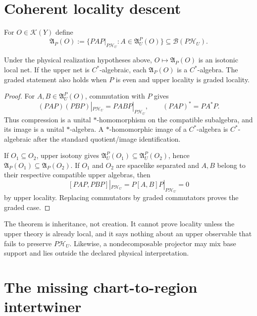 \documentclass[11pt]{article}
\begin{document}
\section{Coherent locality descent}

For $O\in\mathcal K(Y)$ define
\begin{equation}
 \mathfrak A_P(O)
 :=\{PAP|_{P\mathcal H_U}:A\in\mathfrak A_U^P(O)\}
 \subseteq\mathcal B(P\mathcal H_U).
 \label{eq:compressed-net}
\end{equation}

\begin{theorem}\label{thm:descent}
Under the physical realization hypotheses above, $O\mapsto\mathfrak A_P(O)$
is an isotonic local net.  If the upper net is $C^*$-algebraic, each
$\mathfrak A_P(O)$ is a $C^*$-algebra.  The graded statement also holds when
$P$ is even and upper locality is graded locality.
\end{theorem}

\begin{proof}
For $A,B\in\mathfrak A_U^P(O)$, commutation with $P$ gives
\[
 (PAP)(PBP)|_{P\mathcal H_U}=PABP|_{P\mathcal H_U},
 \qquad
 (PAP)^*=PA^*P.
\]
Thus compression is a unital $*$-homomorphism on the compatible subalgebra,
and its image is a unital $*$-algebra.  A $*$-homomorphic image of a
$C^*$-algebra is $C^*$-algebraic after the standard quotient/image
identification.

If $O_1\subseteq O_2$, upper isotony gives
$\mathfrak A_U^P(O_1)\subseteq\mathfrak A_U^P(O_2)$, hence
$\mathfrak A_P(O_1)\subseteq\mathfrak A_P(O_2)$.  If $O_1$ and $O_2$ are
spacelike separated and $A,B$ belong to their respective compatible upper
algebras, then
\[
 [PAP,PBP]|_{P\mathcal H_U}
 =P[A,B]P|_{P\mathcal H_U}=0
\]
by upper locality.  Replacing commutators by graded commutators proves the
graded case.
\end{proof}

The theorem is inheritance, not creation.  It cannot prove locality unless
the upper theory is already local, and it says nothing about an upper
observable that fails to preserve $P\mathcal H_U$.  Likewise, a nondecomposable
projector may mix base support and lies outside the declared physical
interpretation.

\section{The missing chart-to-region intertwiner}
\end{document}
